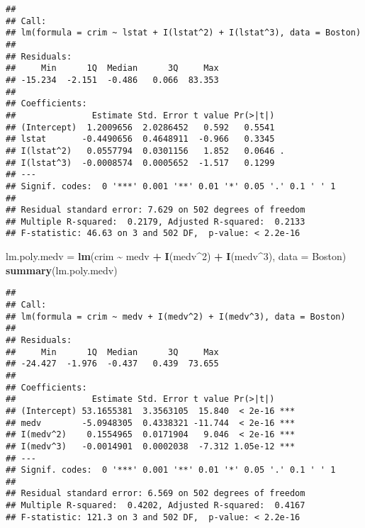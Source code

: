 \documentclass[
]{article}
\newenvironment{Shaded}{\begin{snugshade}}{\end{snugshade}}
\newcommand{\AttributeTok}[1]{\textcolor[rgb]{0.13,0.29,0.53}{#1}}
\newcommand{\DecValTok}[1]{\textcolor[rgb]{0.00,0.00,0.81}{#1}}
\newcommand{\FunctionTok}[1]{\textcolor[rgb]{0.13,0.29,0.53}{\textbf{#1}}}
\newcommand{\NormalTok}[1]{#1}
\newcommand{\OtherTok}[1]{\textcolor[rgb]{0.56,0.35,0.01}{#1}}
\newcommand{\SpecialCharTok}[1]{\textcolor[rgb]{0.81,0.36,0.00}{\textbf{#1}}}
\begin{document}
\begin{verbatim}
## 
## Call:
## lm(formula = crim ~ lstat + I(lstat^2) + I(lstat^3), data = Boston)
## 
## Residuals:
##     Min      1Q  Median      3Q     Max 
## -15.234  -2.151  -0.486   0.066  83.353 
## 
## Coefficients:
##               Estimate Std. Error t value Pr(>|t|)  
## (Intercept)  1.2009656  2.0286452   0.592   0.5541  
## lstat       -0.4490656  0.4648911  -0.966   0.3345  
## I(lstat^2)   0.0557794  0.0301156   1.852   0.0646 .
## I(lstat^3)  -0.0008574  0.0005652  -1.517   0.1299  
## ---
## Signif. codes:  0 '***' 0.001 '**' 0.01 '*' 0.05 '.' 0.1 ' ' 1
## 
## Residual standard error: 7.629 on 502 degrees of freedom
## Multiple R-squared:  0.2179, Adjusted R-squared:  0.2133 
## F-statistic: 46.63 on 3 and 502 DF,  p-value: < 2.2e-16
\end{verbatim}

\begin{Shaded}
\begin{Highlighting}[]
\NormalTok{lm.poly.medv }\OtherTok{=} \FunctionTok{lm}\NormalTok{(crim }\SpecialCharTok{\textasciitilde{}}\NormalTok{ medv }\SpecialCharTok{+} \FunctionTok{I}\NormalTok{(medv}\SpecialCharTok{\^{}}\DecValTok{2}\NormalTok{) }\SpecialCharTok{+} \FunctionTok{I}\NormalTok{(medv}\SpecialCharTok{\^{}}\DecValTok{3}\NormalTok{), }\AttributeTok{data =}\NormalTok{ Boston)}
\FunctionTok{summary}\NormalTok{(lm.poly.medv)}
\end{Highlighting}
\end{Shaded}

\begin{verbatim}
## 
## Call:
## lm(formula = crim ~ medv + I(medv^2) + I(medv^3), data = Boston)
## 
## Residuals:
##     Min      1Q  Median      3Q     Max 
## -24.427  -1.976  -0.437   0.439  73.655 
## 
## Coefficients:
##               Estimate Std. Error t value Pr(>|t|)    
## (Intercept) 53.1655381  3.3563105  15.840  < 2e-16 ***
## medv        -5.0948305  0.4338321 -11.744  < 2e-16 ***
## I(medv^2)    0.1554965  0.0171904   9.046  < 2e-16 ***
## I(medv^3)   -0.0014901  0.0002038  -7.312 1.05e-12 ***
## ---
## Signif. codes:  0 '***' 0.001 '**' 0.01 '*' 0.05 '.' 0.1 ' ' 1
## 
## Residual standard error: 6.569 on 502 degrees of freedom
## Multiple R-squared:  0.4202, Adjusted R-squared:  0.4167 
## F-statistic: 121.3 on 3 and 502 DF,  p-value: < 2.2e-16
\end{verbatim}
\end{document}
